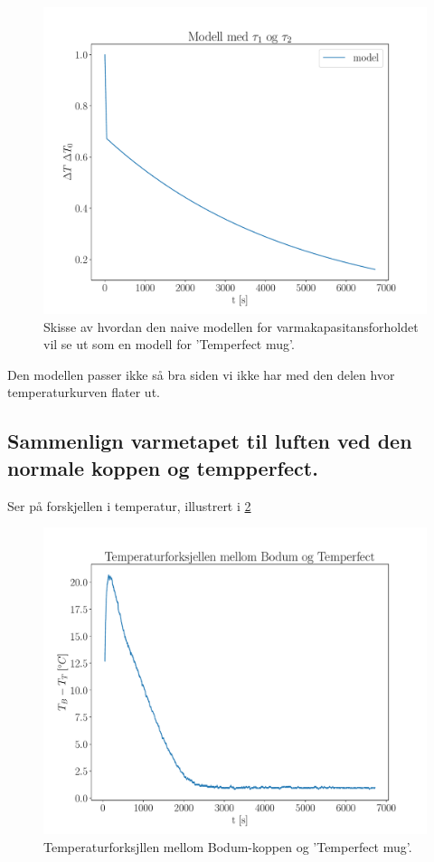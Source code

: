 \documentclass[ reprint, amsmath,amssymb, aps]{revtex4-2}
\begin{document}
\begin{figure}
\centering
\includegraphics[scale=0.35]{2tauplot.pdf}
\caption{Skisse av hvordan den naive modellen for varmakapasitansforholdet vil se ut som en modell for 'Temperfect mug'.}
\label{plot2tau}
\end{figure}

Den modellen passer ikke så bra siden vi ikke har med den delen hvor temperaturkurven flater ut.

\subsection*{Sammenlign varmetapet til luften ved den normale koppen og tempperfect.}

Ser på forskjellen i temperatur, illustrert i \ref{tempdif}

\begin{figure}
\centering
\includegraphics[scale=0.35]{tempzoomedout.pdf}
\caption{Temperaturforksjllen mellom Bodum-koppen og 'Temperfect mug'.}
\label{tempdif}
\end{figure}
\end{document}
